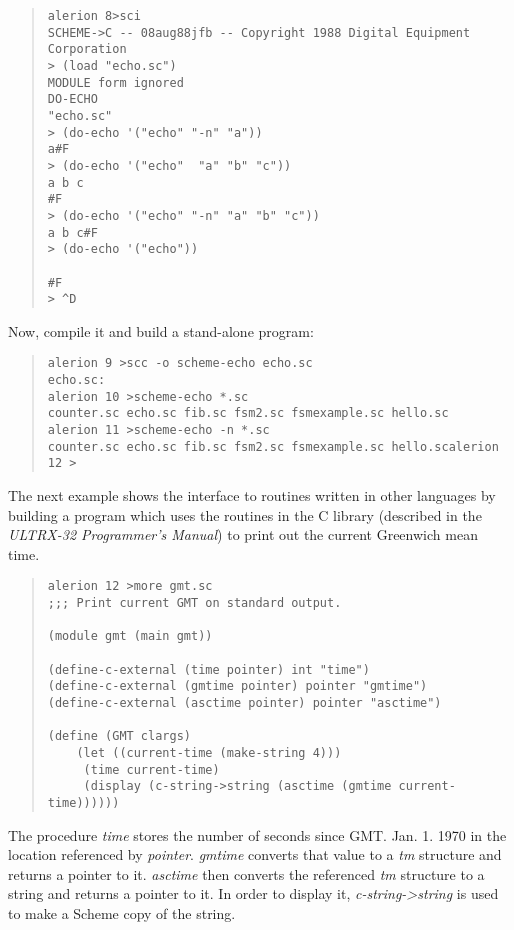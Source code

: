 \documentclass[11pt]{article}
\begin{document}
\begin{small}
\begin{quote}
\begin{verbatim}
alerion 8>sci
SCHEME->C -- 08aug88jfb -- Copyright 1988 Digital Equipment Corporation
> (load "echo.sc")
MODULE form ignored
DO-ECHO
"echo.sc"
> (do-echo '("echo" "-n" "a"))
a#F
> (do-echo '("echo"  "a" "b" "c"))
a b c
#F
> (do-echo '("echo" "-n" "a" "b" "c"))
a b c#F
> (do-echo '("echo"))

#F
> ^D
\end{verbatim}
\end{quote}
\end{small}

Now, compile it and build a stand-alone program:

\begin{small}
\begin{quote}
\begin{verbatim}
alerion 9 >scc -o scheme-echo echo.sc
echo.sc:
alerion 10 >scheme-echo *.sc
counter.sc echo.sc fib.sc fsm2.sc fsmexample.sc hello.sc
alerion 11 >scheme-echo -n *.sc
counter.sc echo.sc fib.sc fsm2.sc fsmexample.sc hello.scalerion 12 >
\end{verbatim}
\end{quote}
\end{small}

The next example shows the interface to routines written in other
languages by building a program which uses the routines in the C library 
(described in the \emph{ULTRX-32 Programmer's Manual}) to print out the
current Greenwich mean time.

\begin{small}
\begin{quote}
\begin{verbatim}
alerion 12 >more gmt.sc
;;; Print current GMT on standard output.

(module gmt (main gmt))

(define-c-external (time pointer) int "time")
(define-c-external (gmtime pointer) pointer "gmtime")
(define-c-external (asctime pointer) pointer "asctime")

(define (GMT clargs)
    (let ((current-time (make-string 4)))
	 (time current-time)
	 (display (c-string->string (asctime (gmtime current-time))))))
\end{verbatim}
\end{quote}
\end{small}

The procedure \emph{time} stores the number of seconds since GMT. Jan.
1. 1970 in the location referenced by \emph{pointer}. \emph{gmtime}
converts that value to a \emph{tm} structure and returns a pointer to
it. \emph{asctime} then converts the referenced \emph{tm} structure to a
string and returns a pointer to it.  In order to display it,
\emph{c-string->string} is used to make a Scheme copy of the string.
\end{document}
